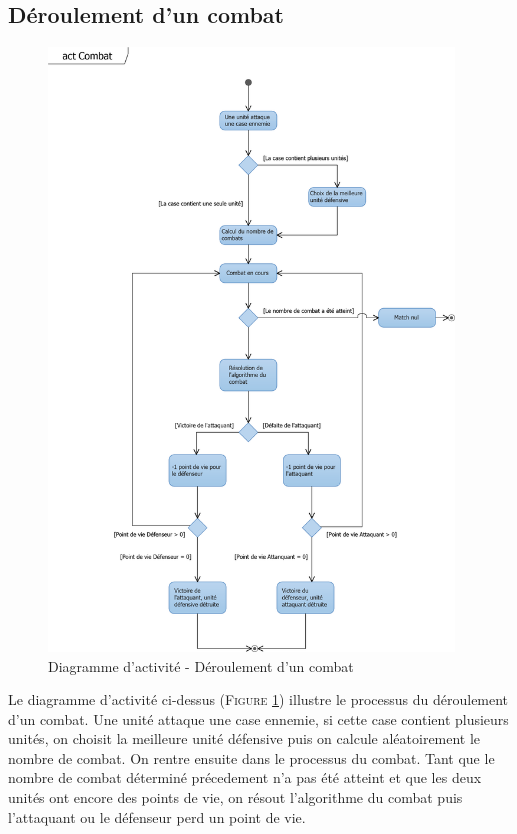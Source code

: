 \documentclass[a4paper,11pt]{article}
\begin{document}
	\subsection{Déroulement d'un combat}
		\begin{figure}[ht!]
			\includegraphics[height=16cm]{actCombat.png}
			\caption{Diagramme d'activité - Déroulement d'un combat}
			\label{fig:actcombat}
		\end{figure}
		\vspace*{1cm}
		Le diagramme d'activité ci-dessus (\textsc{Figure \ref{fig:actcombat}}) illustre le processus du déroulement d'un combat. Une unité attaque une case ennemie, si cette case contient plusieurs unités, on choisit la meilleure unité défensive puis on calcule aléatoirement le nombre de combat. On rentre ensuite dans le processus du combat. Tant que le nombre de combat déterminé précedement n'a pas été atteint et que les deux unités ont encore des points de vie, on résout l'algorithme du combat puis l'attaquant ou le défenseur perd un point de vie.
		\newpage
\end{document}

